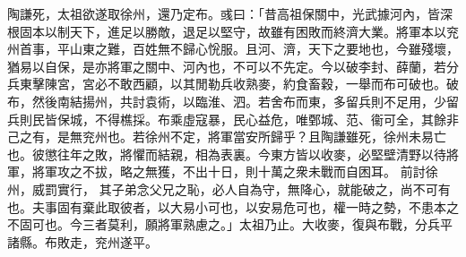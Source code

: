 \begin{pinyinscope}
 
陶謙死，太祖欲遂取徐州，還乃定布。彧曰：「昔高祖保關中，光武據河內，皆深根固本以制天下，進足以勝敵，退足以堅守，故雖有困敗而終濟大業。將軍本以兖州首事，平山東之難，百姓無不歸心恱服。且河、濟，天下之要地也，今雖殘壞，猶易以自保，是亦將軍之關中、河內也，不可以不先定。今以破李封、薛蘭，若分兵東擊陳宮，宮必不敢西顧，以其閒勒兵收熟麥，約食畜穀，一舉而布可破也。破布，然後南結揚州，共討袁術，以臨淮、泗。若舍布而東，多留兵則不足用，少留兵則民皆保城，不得樵採。布乘虛寇暴，民心益危，唯鄄城、范、衞可全，其餘非己之有，是無兖州也。若徐州不定，將軍當安所歸乎？且陶謙雖死，徐州未易亡也。彼懲往年之敗，將懼而結親，相為表裏。今東方皆以收麥，必堅壁清野以待將軍，將軍攻之不拔，略之無獲，不出十日，則十萬之衆未戰而自困耳。
 前討徐州，威罰實行，
 其子弟念父兄之恥，必人自為守，無降心，就能破之，尚不可有也。夫事固有棄此取彼者，以大易小可也，以安易危可也，權一時之勢，不患本之不固可也。今三者莫利，願將軍熟慮之。」太祖乃止。大收麥，復與布戰，分兵平諸縣。布敗走，兖州遂平。
 

\end{pinyinscope}

